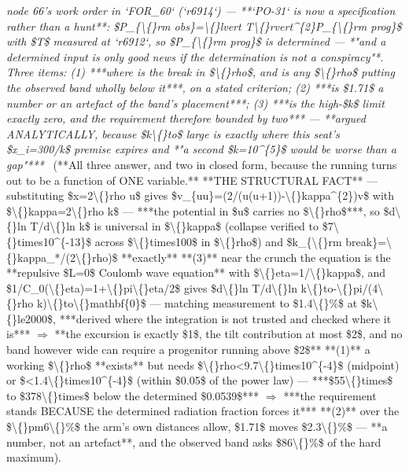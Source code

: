\begin{description}
\textit{node 66's work order in `FOR\_60` (`r6914`) --- **`PO-31` is now a specification rather than a hunt**: \$P\_\{\textbackslash\{\}rm obs\}=\textbackslash\{\}lvert T\textbackslash\{\}rvert\textasciicircum{}\{2\}P\_\{\textbackslash\{\}rm prog\}\$ with \$T\$ measured at `r6912`, so \$P\_\{\textbackslash\{\}rm prog\}\$ is determined --- *"and a determined input is only good news if the determination is not a conspiracy"*. Three items: (1) ***where is the break in \$\textbackslash\{\}rho\$, and is any \$\textbackslash\{\}rho\$ putting the observed band wholly below it***, on a stated criterion; (2) ***is \$1.71\$ a number or an artefact of the band's placement***; (3) ***is the high-\$k\$ limit exactly zero, and the requirement therefore bounded by two*** ---  **argued ANALYTICALLY, because \$k\textbackslash\{\}to\$ large is exactly where this seat's \$x\_i=300/k\$ premise expires and *"a second \$k=10\textasciicircum{}\{5\}\$ would be worse than a gap"***} \ (**All three answer, and two in closed form, because the running turns out to be a function of ONE variable.**  **THE STRUCTURAL FACT** --- substituting \$x=2\textbackslash\{\}rho u\$ gives \$v\_\{uu\}=(2/(u(u+1))-\textbackslash\{\}kappa\textasciicircum{}\{2\})v\$ with \$\textbackslash\{\}kappa=2\textbackslash\{\}rho k\$ --- ***the potential in \$u\$ carries no \$\textbackslash\{\}rho\$***, so \$d\textbackslash\{\}ln T/d\textbackslash\{\}ln k\$ is universal in \$\textbackslash\{\}kappa\$ (collapse verified to \$7\textbackslash\{\}times10\textasciicircum{}\{-13\}\$ across \$\textbackslash\{\}times100\$ in \$\textbackslash\{\}rho\$) and \$k\_\{\textbackslash\{\}rm break\}=\textbackslash\{\}kappa\_*/(2\textbackslash\{\}rho)\$ **exactly**  **(3)** near the crunch the equation is the **repulsive \$L=0\$ Coulomb wave equation** with \$\textbackslash\{\}eta=1/\textbackslash\{\}kappa\$, and \$1/C\_0(\textbackslash\{\}eta)=1+\textbackslash\{\}pi\textbackslash\{\}eta/2\$ gives \$d\textbackslash\{\}ln T/d\textbackslash\{\}ln k\textbackslash\{\}to-\textbackslash\{\}pi/(4\textbackslash\{\}rho k)\textbackslash\{\}to\textbackslash\{\}mathbf\{0\}\$ --- matching measurement to \$1.4\textbackslash\{\}\%\$ at \$k\textbackslash\{\}le2000\$, ***derived where the integration is not trusted and checked where it is*** \ensuremath{\Rightarrow}  **the excursion is exactly \$1\$, the tilt contribution at most \$2\$, and no band however wide can require a progenitor running above \$2\$**  **(1)** a working \$\textbackslash\{\}rho\$ **exists** but needs \$\textbackslash\{\}rho<9.7\textbackslash\{\}times10\textasciicircum{}\{-4\}\$ (midpoint) or \$<1.4\textbackslash\{\}times10\textasciicircum{}\{-4\}\$ (within \$0.05\$ of the power law) --- ***\$55\textbackslash\{\}times\$ to \$378\textbackslash\{\}times\$ below the determined \$0.0539\$*** \ensuremath{\Rightarrow}  ***the requirement stands BECAUSE the determined radiation fraction forces it***  **(2)** over the \$\textbackslash\{\}pm6\textbackslash\{\}\%\$ the arm's own distances allow, \$1.71\$ moves \$2.3\textbackslash\{\}\%\$ --- **a number, not an artefact**, and the observed band asks \$86\textbackslash\{\}\%\$ of the hard maximum). 

\end{description}
